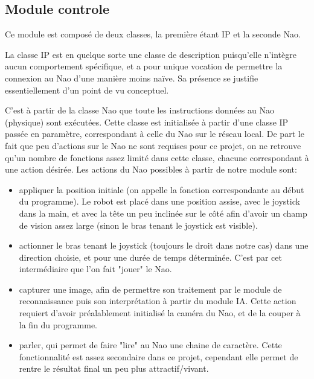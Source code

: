 \subsection{Module controle}
\label{sub:Module controle}
  \par Ce module est composé de deux classes, la première étant IP et la seconde Nao.

  \par La classe IP est en quelque sorte une classe de description puisqu'elle n'intègre aucun comportement spécifique, et a pour unique vocation de permettre la connexion au Nao d'une manière moins naïve.
  Sa présence se justifie essentiellement d'un point de vu conceptuel.

  \par C'est à partir de la classe Nao que toute les instructions données au Nao (physique) sont exécutées.
  Cette classe est initialisée à partir d'une classe IP passée en paramètre, correspondant à celle du Nao sur le réseau local.
  De part le fait que peu d'actions sur le Nao ne sont requises pour ce projet, on ne retrouve qu'un nombre de fonctions assez limité dans cette classe, chacune correspondant à une action désirée.
  Les actions du Nao possibles à partir de notre module sont:
  \begin{itemize}
    \item appliquer la position initiale (on appelle la fonction correspondante au début du programme).
    Le robot est placé dans une position assise, avec le joystick dans la main, et avec la tête un peu inclinée sur le côté afin d'avoir un champ de vision assez large (sinon le bras tenant le joystick est visible).
    \item actionner le bras tenant le joystick (toujours le droit dans notre cas) dans une direction choisie, et pour une durée de temps déterminée.
    C'est par cet intermédiaire que l'on fait "jouer" le Nao.
    \item capturer une image, afin de permettre son traitement par le module de reconnaissance puis son interprétation à partir du module IA.
    Cette action requiert d'avoir préalablement initialisé la caméra du Nao, et de la couper à la fin du programme.
    \item parler, qui permet de faire "lire" au Nao une chaine de caractère.
    Cette fonctionnalité est assez secondaire dans ce projet, cependant elle permet de rentre le résultat final un peu plus attractif/vivant.
  \end{itemize}
